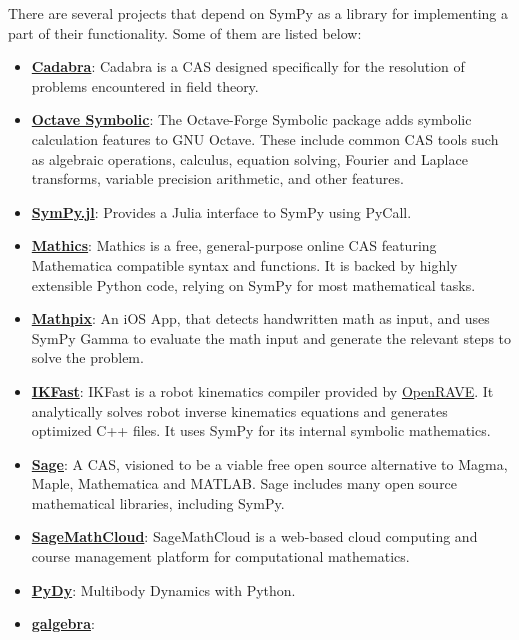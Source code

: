 There are several projects that depend on SymPy as a library for implementing
a part of their functionality. Some of them are listed below:

\begin{itemize}
\item
  \href{http://cadabra.science/index.html}{\textbf{Cadabra}}: Cadabra is
  a CAS designed specifically for the
  resolution of problems encountered in field theory.
\item
  \href{http://octave.sourceforge.net/symbolic/}{\textbf{Octave Symbolic}}:
  The Octave-Forge Symbolic package adds symbolic calculation features
  to GNU Octave. These include common CAS tools such
  as algebraic operations, calculus, equation solving, Fourier and
  Laplace transforms, variable precision arithmetic, and other features.
\item
  \href{https://github.com/jverzani/SymPy.jl}{\textbf{SymPy.jl}}:
  Provides a Julia interface to SymPy using PyCall.
\item
  \href{https://mathics.github.io/}{\textbf{Mathics}}: Mathics is a
  free, general-purpose online CAS featuring Mathematica compatible
  syntax and functions. It is backed by highly extensible Python code,
  relying on SymPy for most mathematical tasks.
\item
  \href{http://mathpix.com/}{\textbf{Mathpix}}: An iOS App, that detects handwritten math as input, and uses
  SymPy Gamma to evaluate the math input and generate the relevant
  steps to solve the problem.
\item
  \href{http://openrave.org/docs/0.8.2/openravepy/ikfast/}{\textbf{IKFast}}:
  IKFast is a robot kinematics compiler provided by
  \href{http://openrave.org/}{OpenRAVE}. It analytically solves robot inverse
  kinematics equations and generates optimized C++ files. It uses SymPy for
  its internal symbolic mathematics.
\item
  \href{http://www.sagemath.org/}{\textbf{Sage}}: A CAS, visioned to be
  a viable free open source alternative to Magma, Maple, Mathematica and
  MATLAB\@. Sage includes many open source mathematical libraries, including
  SymPy.
\item
  \href{https://cloud.sagemath.com}{\textbf{SageMathCloud}}:
  SageMathCloud is a web-based cloud computing and course management
  platform for computational mathematics.
\item
  \href{http://www.pydy.org/}{\textbf{PyDy}}: Multibody Dynamics with
  Python.
\item
  \href{https://github.com/brombo/galgebra}{\textbf{galgebra}}:

\end{itemize}
